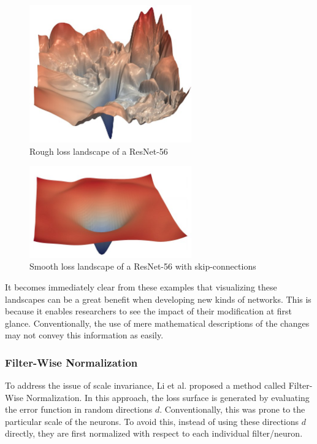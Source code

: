 \documentclass{acmsiggraph}               %
\begin{document}
\begin{figure}
\centering
\includegraphics[width=2.75in]{rough_loss}
\caption{Rough loss landscape of a ResNet-56 \protect\cite{Li2017}}
\label{fig:rough_loss}
\end{figure}

\begin{figure}
  \centering
  \includegraphics[width=2.75in]{smooth_loss}
  \caption{Smooth loss landscape of a ResNet-56 with skip-connections \protect\cite{Li2017,He2015}}
  \label{fig:smooth_loss}
\end{figure}

It becomes immediately clear from these examples that visualizing these landscapes can be a great benefit when developing new kinds of networks. This is because it enables researchers to see the impact of their modification at first glance. Conventionally, the use of mere mathematical descriptions of the changes may not convey this information as easily.

\subsubsection{Filter-Wise Normalization}

To address the issue of scale invariance, Li et al. proposed a method called Filter-Wise Normalization. In this approach, the loss surface is generated by evaluating the error function in random directions $d$. Conventionally, this was prone to the particular scale of the neurons. To avoid this, instead of using these directions $d$ directly, they are first normalized with respect to each individual filter/neuron.
\end{document}
